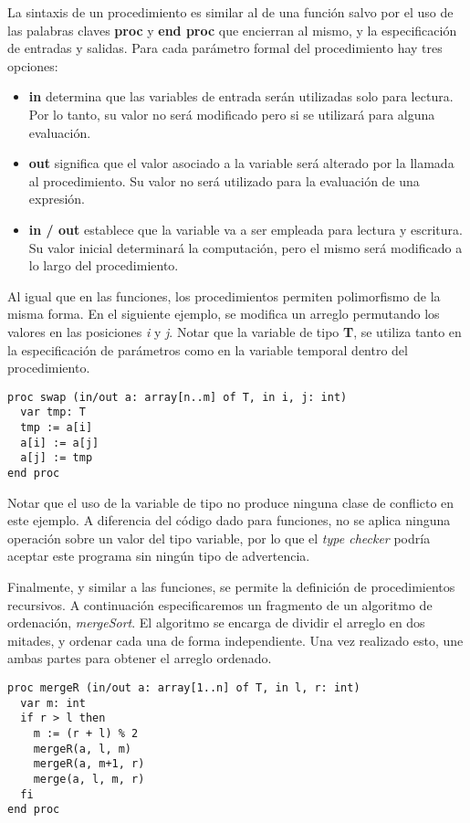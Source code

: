 \documentclass{article}
\begin{document}
La sintaxis de un procedimiento es similar al de una función salvo por el uso de las palabras claves \textbf{proc} y \textbf{end proc} que encierran al mismo, y la especificación de entradas y salidas.
Para cada parámetro formal del procedimiento hay tres opciones:

\begin{itemize}

\item
\textbf{in} determina que las variables de entrada serán utilizadas solo para lectura.
Por lo tanto, su valor no será modificado pero si se utilizará para alguna evaluación.

\item
\textbf{out} significa que el valor asociado a la variable será alterado por la llamada al procedimiento.
Su valor no será utilizado para la evaluación de una expresión.

\item
\textbf{in / out} establece que la variable va a ser empleada para lectura y escritura.
Su valor inicial determinará la computación, pero el mismo será modificado a lo largo del procedimiento.

\end{itemize}

Al igual que en las funciones, los procedimientos permiten polimorfismo de la misma forma.
En el siguiente ejemplo, se modifica un arreglo permutando los valores en las posiciones \textit{i} y \textit{j}.
Notar que la variable de tipo \textbf{T}, se utiliza tanto en la especificación de parámetros como en la variable temporal dentro del procedimiento.
\begin{lstlisting}
proc swap (in/out a: array[n..m] of T, in i, j: int)
  var tmp: T
  tmp := a[i]
  a[i] := a[j]
  a[j] := tmp
end proc
\end{lstlisting}

Notar que el uso de la variable de tipo no produce ninguna clase de conflicto en este ejemplo.
A diferencia del código dado para funciones, no se aplica ninguna operación sobre un valor del tipo variable, por lo que el \textit{type checker} podría aceptar este programa sin ningún tipo de advertencia.

Finalmente, y similar a las funciones, se permite la definición de procedimientos recursivos.
A continuación especificaremos un fragmento de un algoritmo de ordenación, \textit{mergeSort}.
El algoritmo se encarga de dividir el arreglo en dos mitades, y ordenar cada una de forma independiente.
Una vez realizado esto, une ambas partes para obtener el arreglo ordenado.
\begin{lstlisting}
proc mergeR (in/out a: array[1..n] of T, in l, r: int)
  var m: int
  if r > l then
    m := (r + l) % 2
    mergeR(a, l, m)
    mergeR(a, m+1, r)
    merge(a, l, m, r)
  fi
end proc
\end{lstlisting}
\end{document}
